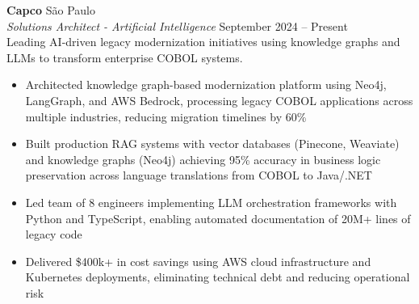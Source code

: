 \documentclass[a4paper]{article}
\begin{document}
\textbf{Capco}                                                      \hfill São Paulo              \\
\textit{Solutions Architect - Artificial Intelligence}               \hfill September 2024 – Present    \\
\vspace{0.5mm}
Leading AI-driven legacy modernization initiatives using knowledge graphs and LLMs to transform enterprise COBOL systems.
\vspace{-2mm}
\begin{itemize}
\setlength\itemsep{-1mm}
\item Architected knowledge graph-based modernization platform using Neo4j, LangGraph, and AWS Bedrock, processing legacy COBOL applications across multiple industries, reducing migration timelines by 60\%
\item Built production RAG systems with vector databases (Pinecone, Weaviate) and knowledge graphs (Neo4j) achieving 95\% accuracy in business logic preservation across language translations from COBOL to Java/.NET
\item Led team of 8 engineers implementing LLM orchestration frameworks with Python and TypeScript, enabling automated documentation of 20M+ lines of legacy code
\item Delivered \$400k+ in cost savings using AWS cloud infrastructure and Kubernetes deployments, eliminating technical debt and reducing operational risk
\end{itemize}
\end{document}
